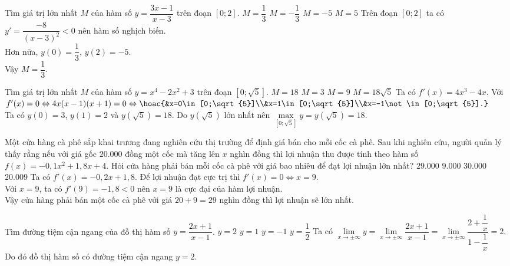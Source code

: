 \begin{ex}%
Tìm giá trị lớn nhất $M$ của hàm số $y=\dfrac{3 x-1}{x-3}$ trên đoạn $[0 ; 2]$.
\choice
{$M=\dfrac{1}{3}$}
{$M=-\dfrac{1}{3}$}
{$M=-5$}
{$M=5$}
\loigiai
{
Trên đoạn  $[0 ; 2]$ ta có $y'=\dfrac{-8}{(x-3)^2} <0$ nên hàm số nghịch biến.\\
Hơn nữa, $y(0)=\dfrac{1}{3},\, y(2)=-5$.\\
Vậy $M=\dfrac{1}{3}$.
}
\end{ex}
\begin{ex}%
Tìm giá trị lớn nhất $M$ của hàm số $y=x^4-2x^2+3$ trên đoạn $[0;\sqrt{5}]$.
\choice
{\True $M=18$}
{$M=3$}
{$M=9$}
{$M=18\sqrt{5}$}
\loigiai
{
Ta có $f'(x)=4x^3-4x$. Với $f'(x)=0\Leftrightarrow 4x(x-1)(x+1)=0\Leftrightarrow\hoac{&x=0\in[0;\sqrt{5}]\\&x=1\in[0;\sqrt{5}]\\&x=-1\not\in[0;\sqrt{5}].}$\\
Ta có $y(0)=3$, $y(1)=2$ và $y\left(\sqrt{5}\right)=18$. Do $y\left(\sqrt{5}\right)$ lớn nhất nên $\max\limits_{[0;\sqrt{5}]}y=y\left(\sqrt{5}\right)=18$.
}
\end{ex}
\begin{ex}%
Một cửa hàng cà phê sắp khai trương đang nghiên cứu thị trường để định giá bán cho mỗi cốc cà phê. Sau khi nghiên cứu, người quản lý thấy rằng nếu với giá gốc $20.000$ đồng một cốc mà tăng lên $x$ nghìn đồng thì lợi nhuận thu được tính theo hàm số $f(x)=-0{,}1x^2+1{,}8x+4$. Hỏi cửa hàng phải bán mỗi cốc cà phê với giá bao nhiêu để đạt lợi nhuận lớn nhất?
\choice
{\True $29.000$}
{$9.000$}
{$30.000$}
{$20.009$}
\loigiai
{
Ta có $f'(x)=-0{,}2x+1,8$. Để lợi nhuận đạt cực trị thì $f'(x)=0\Leftrightarrow x=9$.\\
Với $x=9$, ta có $f'(9)=-1{,}8<0$ nên $x=9$ là cực đại của hàm lợi nhuận.\\
Vậy cửa hàng phải bán một cốc cà phê với giá $20+9=29$ nghìn đồng thì lợi nhuận sẽ lớn nhất.
}
\end{ex}
\begin{ex}%
Tìm đường tiệm cận ngang của đồ thị hàm số $y=\dfrac{2x+1}{x-1}$.
\choice
{\True $y=2$}
{$y=1$}
{$y=-1$}
{$y=\dfrac{1}{2}$}
\loigiai
{
Ta có $\lim\limits_{x\rightarrow\pm\infty}y=\lim\limits_{x\rightarrow\pm\infty}\dfrac{2x+1}{x-1}=\lim\limits_{x\rightarrow\pm\infty}\dfrac{2+\dfrac{1}{x}}{1-\dfrac{1}{x}}=2$.\\
Do đó đồ thị hàm số có đường tiệm cận ngang $y=2$.
}
\end{ex}
